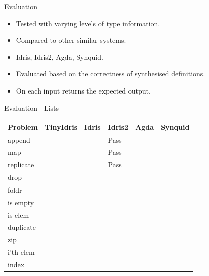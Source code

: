 \documentclass[presentation]{beamer}
\begin{document}
\begin{frame}[fragile]{Evaluation}
  \begin{itemize}
  \item Tested with varying levels of type information.\\
  \item Compared to other similar systems.\\
  \item Idris, Idris2, Agda, Synquid.\\
  \item Evaluated based on the correctness of synthesised definitions.\\
  \item On each input returns the expected output.
  \end{itemize}
\end{frame}

\begin{frame}[fragile]{Evaluation - Lists}
\begin{center}
\begin{tabular}{|l|l|l|l|l|l|}
\hline
Problem & TinyIdris & Idris & Idris2 & Agda & Synquid \\
\hline
append &   &   & Pass &  &  \\
map &   &   & Pass &  & \\
replicate &   &   & Pass &  & \\
drop &   &   &   &  &   \\
foldr &   &   &   & &  \\
is empty &   &   &   &  & \\
is elem &   &   &   & &  \\
duplicate &   &   &   & &  \\
zip &   &   &   & & \\
i'th elem &   &   &   & & \\
index &   &   &   & & \\
\hline
\end{tabular}
\end{center}
\end{frame}
\end{document}
